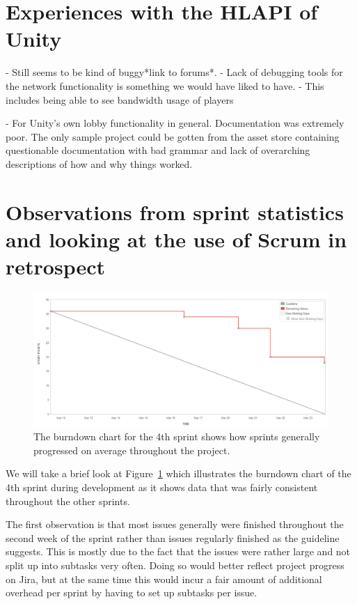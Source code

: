 \section{Experiences with the HLAPI of Unity}
    - Still seems to be kind of buggy*link to forums*. 
    - Lack of debugging tools for the network functionality is something we would have liked to have.
        - This includes being able to see bandwidth usage of players
    
    - For Unity's own lobby functionality in general. Documentation was extremely poor. The only sample project could be gotten from the asset store containing questionable documentation with bad grammar and lack of overarching descriptions of how and why things worked.  

\section{Observations from sprint statistics and looking at the use of Scrum in retrospect}
\begin{figure}[tbph]
    \centering
    \includegraphics[width=\textwidth]{images/DOCKLSprint4}
    \caption[Burndown chart from the 4th sprint]{The burndown chart for the 4th sprint shows how sprints generally progressed on average throughout the project.}
    \label{fig:burndownChart}
\end{figure}

We will take a brief look at Figure~\ref{fig:burndownChart} which illustrates the burndown chart of the 4th sprint during development as it shows data that was fairly consistent throughout the other sprints. 

The first observation is that most issues generally were finished throughout the second week of the sprint rather than issues regularly finished as the guideline suggests. This is mostly due to the fact that the issues were rather large and not split up into subtasks very often. Doing so would better reflect project progress on Jira, but at the same time this would incur a fair amount of additional overhead per sprint by having to set up subtasks per issue. 

